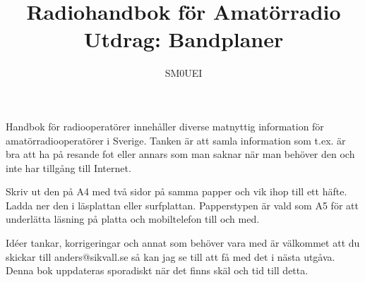 
\title{Radiohandbok för Amatörradio\\Utdrag: Bandplaner}
\author{SM0UEI}
\maketitle

Handbok för radiooperatörer innehåller diverse matnyttig information
för ama\-tör\-radio\-oper\-atör\-er i Sverige. Tanken är att samla
information som t.ex. är bra att ha på resande fot eller annars som
man saknar när man behöver den och inte har tillgång till Internet.

Skriv ut den på A4 med två sidor på samma papper och vik ihop till ett
häfte. Ladda ner den i läsplattan eller surfplattan. Papperstypen är
vald som A5 för att underlätta läsning på platta och mobiltelefon till
och med.

Idéer tankar, korrigeringar och annat som behöver vara med är
väl\-kom\-met att du skickar till anders@sikvall.se så kan jag se till
att få med det i nästa utgåva. Denna bok uppdateras sporadiskt när det
finns skäl och tid till detta.

\clearpage
\tableofcontents
\clearpage

\setlength{\parskip}{0.5em}
\setlength{\parindent}{0pt}
